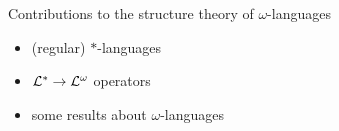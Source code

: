\documentclass[a4,notes]{seminar}
\begin{document}
\begin{slide}
\center\huge Contributions to the structure theory of $ω$-languages
\end{slide}

\begin{slide}
\begin{itemize}
\item (regular) $*$-languages
\item $\mathcal{L}^* \rightarrow \mathcal{L}^\omega$ operators
\item some results about $\omega$-languages
\end{itemize}
\end{slide}

\begin{slide}

\end{slide}
\end{document}
